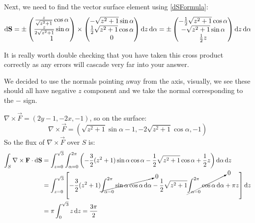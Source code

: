 \documentclass[../main.tex]{subfiles}
\begin{document}
Next, we need to find the vector surface element using \cref{dSFormula}:
\[
  \d{\vec{S}} = \pm \begin{pmatrix}
  \frac{z}{\sqrt{z^2 + 1}} \cos \alpha \\
  \frac{z}{2\sqrt{z^2 + 1}} \sin \alpha \\
  1 \\
  \end{pmatrix} \times \begin{pmatrix}
  - \sqrt{z^2 + 1} \sin \alpha \\
  \frac{1}{2} \sqrt{z^2 + 1} \cos \alpha \\
  0 \\
  \end{pmatrix} \d{z}\d{\alpha} = \pm \begin{pmatrix}
  -\frac{1}{2}\sqrt{z^2 + 1} \cos \alpha \\
  - \sqrt{z^2 + 1} \sin \alpha \\
  \frac{1}{2} z \\
  \end{pmatrix} \d{z} \d{\alpha}
\]
\begin{remark}[Advice]
  It is really worth double checking that you have taken this cross product correctly as any errors will cascade very far into your answer.
\end{remark}
We decided to use the normals pointing away from the axis, visually, we see these should all have negative $z$ component and we take the normal corresponding to the $-$ sign.

$\nabla \times \vec{F} = (2y - 1, -2x, -1)$, so on the surface:
\[
  \nabla \times \vec{F} = \left(\sqrt{z^2 + 1} \sin \alpha - 1, -2 \sqrt{z^2 + 1} \cos \alpha, -1\right)
\]
So the flux of $\nabla \times \vec{F}$ over $S$ is:
\begin{align*}
  \int_{S} \nabla \times \vec{F} \cdot \d{\vec{S}} &= \int_{z = 0}^{\sqrt{3}} \int_{\alpha = 0}^{2\pi} \left(-\frac{3}{2}(z^2 + 1)\sin \alpha \cos \alpha - \frac{1}{2}\sqrt{z^2 + 1}\cos \alpha + \frac{1}{2}z\right) \d{\alpha} \d{z} \\
                                                   &= \int_{z = 0}^{\sqrt{3}}\left[ -\frac{3}{2}(z^2 + 1)\cancelto{0}{\int_{\alpha = 0}^{2\pi} \sin \alpha \cos \alpha \d{\alpha}} - \frac{1}{2}\sqrt{z^2 + 1} \cancelto{0}{\int_{\alpha = 0}^{2\pi} \cos\alpha \d{\alpha}} + \pi z\right] \d{z} \\
                                                   &= \pi \int_{0}^{\sqrt{3}} z \d{z} = \frac{3\pi}{2}
\end{align*}
\end{document}
